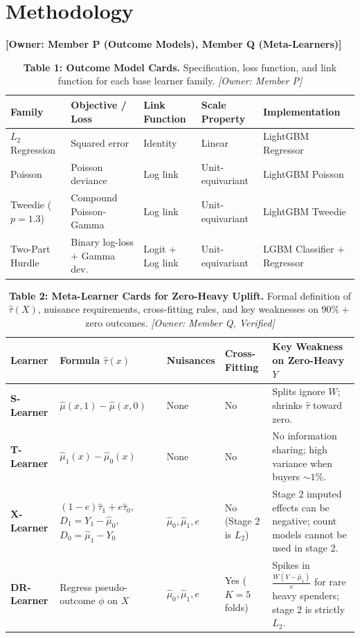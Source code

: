 \documentclass[11pt,a4paper]{article}
\begin{document}
\section{Methodology}
\label{sec:methods}
\noindent \textbf{[Owner: Member P (Outcome Models), Member Q (Meta-Learners)]}

\begin{table}[htbp]
\centering
\caption{\textbf{Table 1: Outcome Model Cards.} Specification, loss function, and link function for each base learner family. \textit{[Owner: Member P]}}
\label{tab:model_cards}
\begin{tabular}{lllll}
\toprule
Family & Objective / Loss & Link Function & Scale Property & Implementation \\
\midrule
$L_2$ Regression & Squared error & Identity & Linear & LightGBM Regressor \\
Poisson & Poisson deviance & Log link & Unit-equivariant & LightGBM Poisson \\
Tweedie ($p=1.3$) & Compound Poisson-Gamma & Log link & Unit-equivariant & LightGBM Tweedie \\
Two-Part Hurdle & Binary log-loss + Gamma dev. & Logit + Log link & Unit-equivariant & LGBM Classifier + Regressor \\
\bottomrule
\end{tabular}
\end{table}

\begin{table}[htbp]
\centering
\small
\caption{\textbf{Table 2: Meta-Learner Cards for Zero-Heavy Uplift.} Formal definition of $\hat{\tau}(X)$, nuisance requirements, cross-fitting rules, and key weaknesses on $90\%+$ zero outcomes. \textit{[Owner: Member Q, Verified]}}
\label{tab:learner_cards}
\begin{tabular}{p{2.2cm}p{3.8cm}p{2.5cm}p{2cm}p{4.2cm}}
\toprule
Learner & Formula $\hat{\tau}(x)$ & Nuisances & Cross-Fitting & Key Weakness on Zero-Heavy $Y$ \\
\midrule
\textbf{S-Learner} & $\hat{\mu}(x, 1) - \hat{\mu}(x, 0)$ & None & No & Splits ignore $W$; shrinks $\hat{\tau}$ toward zero. \\
\addlinespace
\textbf{T-Learner} & $\hat{\mu}_1(x) - \hat{\mu}_0(x)$ & None & No & No information sharing; high variance when buyers $\sim 1\%$. \\
\addlinespace
\textbf{X-Learner} & $(1-e)\hat{\tau}_1 + e\hat{\tau}_0$, $D_1 = Y_1 - \hat{\mu}_0$, $D_0 = \hat{\mu}_1 - Y_0$ & $\hat{\mu}_0, \hat{\mu}_1, e$ & No (Stage 2 is $L_2$) & Stage 2 imputed effects can be negative; count models cannot be used in stage 2. \\
\addlinespace
\textbf{DR-Learner} & Regress pseudo-outcome $\phi$ on $X$ & $\hat{\mu}_0, \hat{\mu}_1, e$ & Yes ($K=5$ folds) & Spikes in $\frac{W(Y-\hat{\mu}_1)}{e}$ for rare heavy spenders; stage 2 is strictly $L_2$. \\
\bottomrule
\end{tabular}
\end{table}
\end{document}
